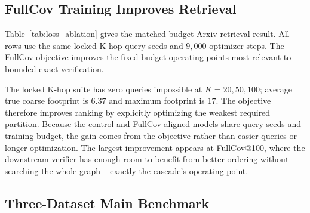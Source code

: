 \documentclass[sigconf, nonacm]{acmart}
\begin{document}
\subsection{FullCov Training Improves Retrieval}
\label{sec:fullcov}

Table~\ref{tab:loss_ablation} gives the matched-budget Arxiv retrieval result. All rows use the same locked K-hop query seeds and $9{,}000$ optimizer steps. The FullCov objective improves the fixed-budget operating points most relevant to bounded exact verification.

\begin{table}[t]
\centering
\caption{\textbf{Matched Arxiv retrieval objective ablation.} Fixed retrieval budgets on $n{=}400$ locked K-hop queries (200 per query seed); each row averages the validation-selected checkpoint from two independent training replicates.}
\label{tab:loss_ablation}
\small
\setlength{\tabcolsep}{5pt}
\end{table}

The locked K-hop suite has zero queries impossible at $K{=}20,50,100$; average true coarse footprint is $6.37$ and maximum footprint is $17$. The objective therefore improves ranking by explicitly optimizing the weakest required partition. Because the control and FullCov-aligned models share query seeds and training budget, the gain comes from the objective rather than easier queries or longer optimization. The largest improvement appears at FullCov@100, where the downstream verifier has enough room to benefit from better ordering without searching the whole graph -- exactly the cascade's operating point.

\subsection{Three-Dataset Main Benchmark}
\label{sec:mainbench}
\end{document}
